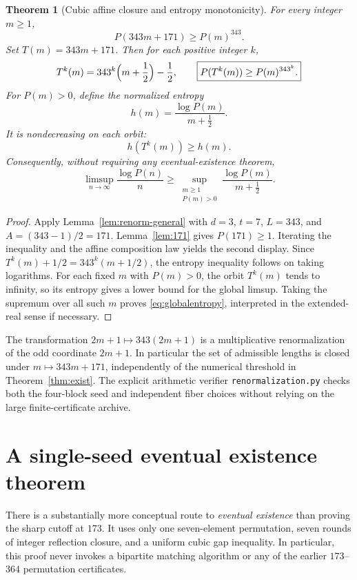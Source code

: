 \documentclass[10pt]{article}
\newtheorem{theorem}{Theorem}
\begin{document}
\begin{theorem}[Cubic affine closure and entropy monotonicity]
\label{thm:renorm}
For every integer $m\ge1$,
\[
\boxed{P(343m+171)\ge P(m)^{343}.}
\]
Set $T(m)=343m+171$. Then for each
positive integer $k$,
\[
T^k(m)=343^k\Bigl(m+\frac12\Bigr)-\frac12,
\qquad
\boxed{P(T^k(m))\ge P(m)^{343^k}.}
\]
For $P(m)>0$, define the normalized entropy
\[
h(m)=\frac{\log P(m)}{m+\frac12}.
\]
It is nondecreasing on each orbit:
\[
\boxed{h(T^k(m))\ge h(m).}
\]
Consequently, without requiring any
eventual-existence theorem,
\begin{equation}\label{eq:globalentropy}
\boxed{\displaystyle
\limsup_{n\to\infty}\frac{\log P(n)}n
\ge\sup_{\substack{m\ge1\\P(m)>0}}
\frac{\log P(m)}{m+\frac12}.}
\end{equation}
\end{theorem}
\begin{proof}
Apply Lemma~\ref{lem:renorm-general}
with $d=3$, $t=7$, $L=343$, and
$A=(343-1)/2=171$.
Lemma~\ref{lem:171} gives $P(171)\ge1$.
Iterating the inequality and the affine
composition law yields the second display.
Since $T^k(m)+1/2=343^k(m+1/2)$,
the entropy inequality follows on
taking logarithms.
For each fixed $m$ with $P(m)>0$,
the orbit $T^k(m)$ tends to infinity,
so its entropy gives a lower bound
for the global limsup. Taking the
supremum over all such $m$ proves
\eqref{eq:globalentropy}, interpreted
in the extended-real sense if necessary.
\end{proof}

The transformation $2m+1\mapsto343(2m+1)$
is a multiplicative renormalization of
the odd coordinate $2m+1$.
In particular the set of admissible
lengths is closed under
$m\mapsto343m+171$, independently of
the numerical threshold in
Theorem~\ref{thm:exist}.
The explicit arithmetic verifier
\texttt{renormalization.py} checks both
the four-block seed and independent
fiber choices without relying on the
large finite-certificate archive.

\section{A single-seed eventual existence theorem}
\label{sec:one-seed}
There is a substantially more conceptual route
to \emph{eventual existence} than proving the
sharp cutoff at $173$. It uses only one
seven-element permutation, seven rounds of
integer reflection closure, and a uniform
cubic gap inequality. In particular, this
proof never invokes a bipartite matching
algorithm or any of the earlier $173$--$364$
permutation certificates.
\end{document}
